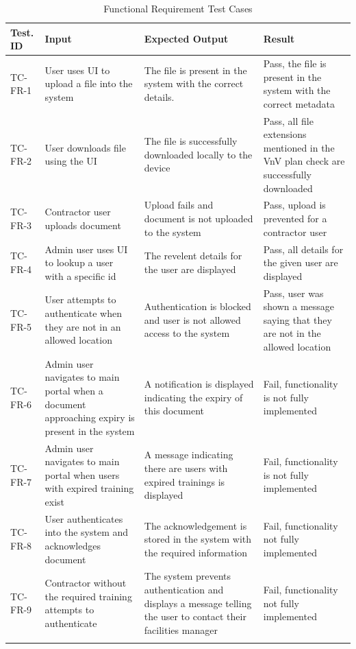 \documentclass[12pt, titlepage]{article}
\begin{document}
\begin{longtable}{|m{1cm}|m{3cm}|m{5cm}|m{3cm}|}
  \hline
  \textbf{Test. ID} & \textbf{Input} & \textbf{Expected Output} &
  \textbf{Result} \\
  \hline
  TC-FR-1 & User uses UI to upload a file into the system & The file is
  present in the system with the correct details. & Pass, the file is
  present in the system with the correct metadata\\ \hline
  TC-FR-2 & User downloads file using the UI & The file is successfully
  downloaded locally to the device & Pass, all file extensions mentioned in the
  VnV plan check are successfully downloaded\\ \hline
  TC-FR-3 & Contractor user uploads document & Upload fails and document is not
  uploaded to the system & Pass, upload is prevented for a contractor
  user\\ \hline
  TC-FR-4 & Admin user uses UI to lookup a user with a specific id & The
  revelent details for the user are displayed & Pass, all details for
  the given user are displayed\\ \hline
  TC-FR-5 & User attempts to authenticate when they are not in an allowed
  location & Authentication is blocked and user is not allowed access to the
  system & Pass, user was shown a message saying that they are not in the
  allowed location\\ \hline
  TC-FR-6 & Admin user navigates to main portal when a document
  approaching expiry is present in the system & A notification is displayed
  indicating the expiry of this document&
  Fail, functionality is not fully implemented\\ \hline
  TC-FR-7 & Admin user navigates to main portal when users with
  expired training exist & A message indicating there are users with
  expired trainings is displayed&
  Fail, functionality is not fully implemented\\ \hline
  TC-FR-8 & User authenticates into the system and acknowledges
  document & The acknowledgement is stored in the system with the
  required information &
  Fail, functionality not fully implemented\\ \hline
  TC-FR-9 & Contractor without the required training attempts to
  authenticate & The system prevents authentication and displays a
  message telling the user to contact their facilities manager &
  Fail, functionality not fully implemented\\ \hline
  \caption{Functional Requirement Test Cases}
\end{longtable}
\end{document}

